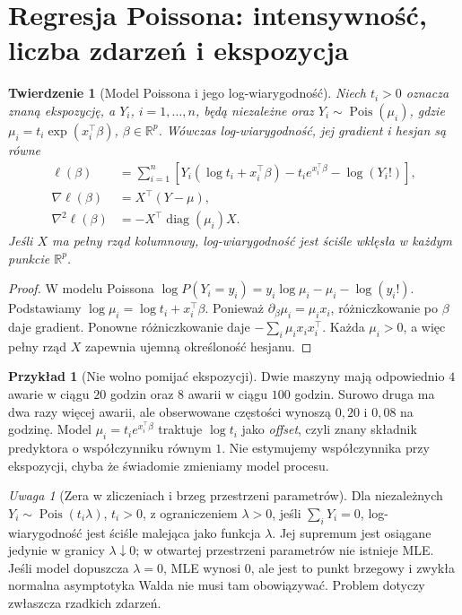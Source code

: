 \documentclass[11pt,a4paper,oneside]{report}
\numberwithin{equation}{chapter}
\theoremstyle{plain}
\newtheorem{twierdzenie}{Twierdzenie}[chapter]
\theoremstyle{definition}
\newtheorem{przyklad}{Przykład}[chapter]
\theoremstyle{remark}
\newtheorem{uwaga}{Uwaga}[chapter]
\newcommand{\R}{\mathbb R}
\DeclareMathOperator{\Pois}{Pois}
\begin{document}
\section{Regresja Poissona: intensywność, liczba zdarzeń i ekspozycja}
\begin{twierdzenie}[Model Poissona i jego log-wiarygodność]
\label{thm:poisson-glm-score}
Niech $t_i>0$ oznacza znaną ekspozycję, a
$Y_i$, $i=1,\ldots,n$, będą niezależne oraz
$Y_i\sim\Pois(\mu_i)$, gdzie
$\mu_i=t_i\exp(x_i^\top\beta)$, $\beta\in\R^p$.
Wówczas log-wiarygodność, jej gradient i hesjan są równe
\[
 \begin{aligned}
 \ell(\beta)&=\sum_{i=1}^n
 [Y_i(\log t_i+x_i^\top\beta)
      -t_i e^{x_i^\top\beta}-\log(Y_i!)],\\
 \nabla\ell(\beta)&=X^\top(Y-\mu),\\
 \nabla^2\ell(\beta)&=-X^\top\operatorname{diag}(\mu_i)X.
 \end{aligned}
\]
Jeśli $X$ ma pełny rząd kolumnowy, log-wiarygodność
jest ściśle wklęsła w każdym punkcie $\R^p$.
\end{twierdzenie}
\begin{proof}
W modelu Poissona
$\log P(Y_i=y_i)=y_i\log\mu_i-\mu_i-\log(y_i!)$.
Podstawiamy $\log\mu_i=\log t_i+x_i^\top\beta$.
Ponieważ $\partial_\beta\mu_i=\mu_ix_i$,
różniczkowanie po $\beta$ daje gradient.
Ponowne różniczkowanie daje
$-\sum_i\mu_ix_ix_i^\top$.
Każda $\mu_i>0$, a więc pełny rząd $X$ zapewnia
ujemną określoność hesjanu.
\end{proof}

\begin{przyklad}[Nie wolno pomijać ekspozycji]
Dwie maszyny mają odpowiednio $4$ awarie w ciągu
$20$ godzin oraz $8$ awarii w ciągu $100$ godzin.
Surowo druga ma dwa razy więcej awarii, ale
obserwowane częstości wynoszą $0{,}20$ i $0{,}08$
na godzinę. Model $\mu_i=t_i e^{x_i^\top\beta}$
traktuje $\log t_i$ jako \emph{offset}, czyli
znany składnik predyktora o współczynniku równym $1$.
Nie estymujemy współczynnika przy ekspozycji,
chyba że świadomie zmieniamy model procesu.
\end{przyklad}

\begin{uwaga}[Zera w zliczeniach i brzeg przestrzeni parametrów]
Dla niezależnych $Y_i\sim\Pois(t_i\lambda)$,
$t_i>0$, z ograniczeniem $\lambda>0$, jeśli
$\sum_iY_i=0$, log-wiarygodność jest ściśle
malejąca jako funkcja $\lambda$. Jej supremum jest
osiągane jedynie w granicy $\lambda\downarrow0$;
w otwartej przestrzeni parametrów nie istnieje MLE.
Jeśli model dopuszcza $\lambda=0$, MLE wynosi $0$,
ale jest to punkt brzegowy i zwykła normalna asymptotyka
Walda nie musi tam obowiązywać. Problem dotyczy
zwłaszcza rzadkich zdarzeń.
\end{uwaga}
\end{document}
